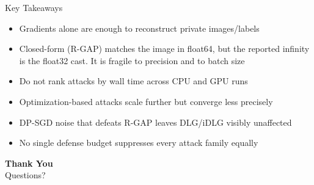 \documentclass[aspectratio=169,xcolor=dvipsnames]{beamer}
\begin{document}
\begin{frame}{Key Takeaways}
\begin{itemize}
\item Gradients alone are enough to reconstruct private images/labels
\item Closed-form (R-GAP) matches the image in float64, but the reported infinity
is the float32 cast. It is fragile to precision and to batch size
\item Do not rank attacks by wall time across CPU and GPU runs
\item Optimization-based attacks scale further but converge less precisely
\item DP-SGD noise that defeats R-GAP leaves DLG/iDLG visibly unaffected
\item No single defense budget suppresses every attack family equally
\end{itemize}
\end{frame}


\begin{frame}
\begin{center}
{\Large \textbf{Thank You}}\\[1em]
{\large Questions?}
\end{center}
\end{frame}

\end{document}

